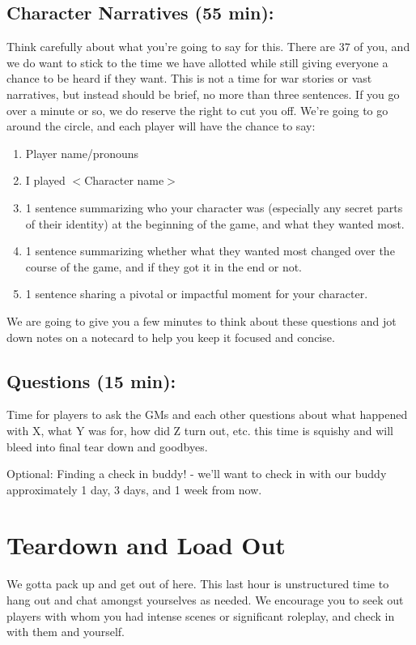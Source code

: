 \documentclass[green]{GL2020}
\begin{document}
\subsection*{Character Narratives (55 min):}
Think carefully about what you’re going to say for this. There are 37 of you, and we do want to stick to the time we have allotted while still giving everyone a chance to be heard if they want. This is not a time for war stories or vast narratives, but instead should be brief, no more than three sentences.  If you go over a minute or so, we do reserve the right to cut you off.  We’re going to go around the circle, and each player will have the chance to say:
\begin{enumerate}
	\item Player name/pronouns
	\item I played $<$Character name$>$
	\item 1 sentence summarizing who your character was (especially any secret parts of their identity) at the beginning of the game, and what they wanted most.
	\item 1 sentence summarizing whether what they wanted most changed over the course of the game, and if they got it in the end or not. 
	\item 1 sentence sharing a pivotal or impactful moment for your character.
\end{enumerate}

We are going to give you a few minutes to think about these questions and jot down notes on a notecard to help you keep it focused and concise. 

\subsection*{Questions (15 min):}
Time for players to ask the GMs and each other questions about what happened with X, what Y was for, how did Z turn out, etc. this time is squishy and will bleed into final tear down and goodbyes.

Optional: Finding a check in buddy! - we’ll want to check in with our buddy approximately 1 day, 3 days, and 1 week from now.


\section*{Teardown and Load Out}
We gotta pack up and get out of here. This last hour is unstructured time to hang out and chat amongst yourselves as needed. We encourage you to seek out players with whom  you had intense scenes or significant roleplay, and check in with them and yourself.
\end{document}
